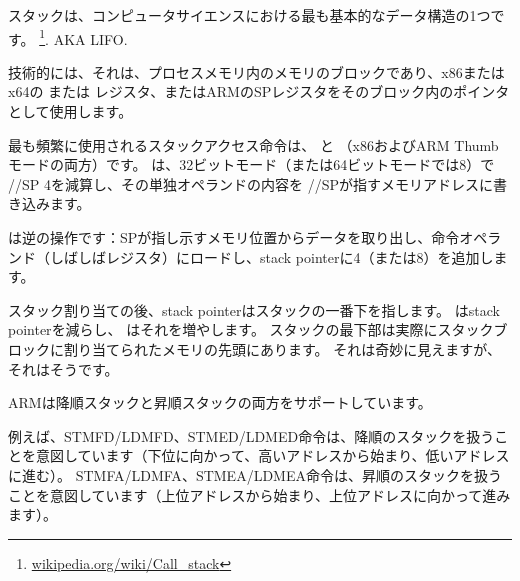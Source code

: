 \mysection{\Stack}
\label{sec:stack}
\myindex{\Stack}

スタックは、コンピュータサイエンスにおける最も基本的なデータ構造の1つです。
\footnote{\href{http://go.yurichev.com/17119}{wikipedia.org/wiki/Call\_stack}}.
\ac{AKA} \ac{LIFO}.

技術的には、それは、プロセスメモリ内のメモリのブロックであり、x86またはx64の \ESP または \RSP レジスタ、またはARMの\ac{SP}レジスタをそのブロック内のポインタとして使用します。

最も頻繁に使用されるスタックアクセス命令は、 \PUSH と \POP （x86およびARM Thumbモードの両方）です。 
\PUSH は、32ビットモード（または64ビットモードでは8）で \ESP/\RSP/\ac{SP} 4を減算し、その単独オペランドの内容を \ESP/\RSP/\ac{SP}が指すメモリアドレスに書き込みます。

\POP は逆の操作です：\ac{SP}が指し示すメモリ位置からデータを取り出し、命令オペランド（しばしばレジスタ）にロードし、\gls{stack pointer}に4（または8）を追加します。

スタック割り当ての後、\gls{stack pointer}はスタックの一番下を指します。 \PUSH は\gls{stack pointer}を減らし、 \POP はそれを増やします。 
スタックの最下部は実際にスタックブロックに割り当てられたメモリの先頭にあります。 それは奇妙に見えますが、それはそうです。

ARMは降順スタックと昇順スタックの両方をサポートしています。


例えば、\ac{STMFD}/\ac{LDMFD}、\ac{STMED}/\ac{LDMED}命令は、降順のスタックを扱うことを意図しています（下位に向かって、高いアドレスから始まり、低いアドレスに進む）。 \ac{STMFA}/\ac{LDMFA}、\ac{STMEA}/\ac{LDMEA}命令は、昇順のスタックを扱うことを意図しています（上位アドレスから始まり、上位アドレスに向かって進みます）。


